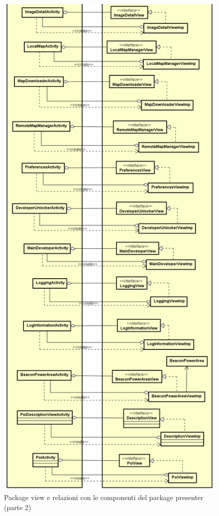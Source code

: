 \documentclass[../DefinizioneDiProdotto.tex,lanscape]{subfiles}
\begin{document}
\begin{figure}[p]
	\centering
	\includegraphics[height=0.9\textheight, width=\textwidth, keepaspectratio]{img/RelationPackage/view2}
	\caption{Package view e relazioni con le componenti del package presenter (parte 2)}
	\label{viewPackage2}
\end{figure}
\end{document}
